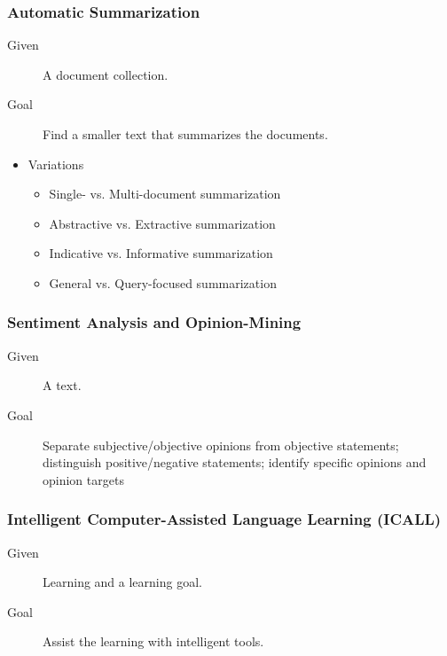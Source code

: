             \subsubsection{Automatic Summarization} %
	            \begin{description}
	            	\item[Given] A document collection.
	            	\item[Goal] Find a smaller text that summarizes the documents.
	            \end{description}
            	\begin{itemize}
            		\item Variations
            			\begin{itemize}
            				\item Single- vs. Multi-document summarization
            				\item Abstractive vs. Extractive summarization
            				\item Indicative vs. Informative summarization
            				\item General vs. Query-focused summarization
            			\end{itemize}
            	\end{itemize}
            
            \subsubsection{Sentiment Analysis and Opinion-Mining} %
	            \begin{description}
	            	\item[Given] A text.
	            	\item[Goal] Separate subjective/objective opinions from objective statements; distinguish positive/negative statements; identify specific opinions and opinion targets
	            \end{description}
            
            \subsubsection{Intelligent Computer-Assisted Language Learning (ICALL)} %
	            \begin{description}
	            	\item[Given] Learning and a learning goal.
	            	\item[Goal] Assist the learning with intelligent tools.
	            \end{description}

